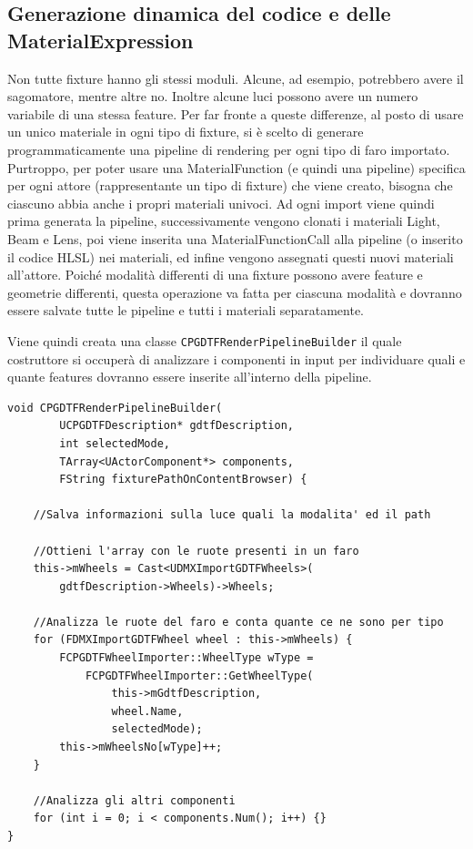 \documentclass[main.tex]{subfiles}
\begin{document}
\clearpage %
\lstset{language=UEcpp}
\subsection{Generazione dinamica del codice e delle MaterialExpression}\label{subsec:2_codeGeneration}
Non tutte fixture hanno gli stessi moduli. Alcune, ad esempio, potrebbero avere il sagomatore, mentre altre no. Inoltre alcune luci possono avere un numero variabile di una stessa feature. Per far fronte a queste differenze, al posto di usare un unico materiale in ogni tipo di fixture, si è scelto di generare programmaticamente una pipeline di rendering per ogni tipo di faro importato. Purtroppo, per poter usare una MaterialFunction (e quindi una pipeline) specifica per ogni attore (rappresentante un tipo di fixture) che viene creato, bisogna che ciascuno abbia anche i propri materiali univoci. Ad ogni import viene quindi prima generata la pipeline, successivamente vengono clonati i materiali Light, Beam e Lens, poi viene inserita una MaterialFunctionCall alla pipeline (o inserito il codice HLSL) nei materiali, ed infine vengono assegnati questi nuovi materiali all'attore. \newline
Poiché modalità differenti di una fixture possono avere feature e geometrie differenti, questa operazione va fatta per ciascuna modalità e dovranno essere salvate tutte le pipeline e tutti i materiali separatamente. \newline

Viene quindi creata una classe \lstinline{CPGDTFRenderPipelineBuilder} il quale costruttore si occuperà di analizzare i componenti in input per individuare quali e quante features dovranno essere inserite all'interno della pipeline.
\begin{lstlisting}
void CPGDTFRenderPipelineBuilder(
        UCPGDTFDescription* gdtfDescription,
        int selectedMode,
        TArray<UActorComponent*> components,
        FString fixturePathOnContentBrowser) {

    //Salva informazioni sulla luce quali la modalita' ed il path

	//Ottieni l'array con le ruote presenti in un faro
    this->mWheels = Cast<UDMXImportGDTFWheels>(
        gdtfDescription->Wheels)->Wheels;

    //Analizza le ruote del faro e conta quante ce ne sono per tipo
	for (FDMXImportGDTFWheel wheel : this->mWheels) {
		FCPGDTFWheelImporter::WheelType wType =
            FCPGDTFWheelImporter::GetWheelType(
                this->mGdtfDescription,
                wheel.Name,
                selectedMode);
		this->mWheelsNo[wType]++;
	}

    //Analizza gli altri componenti
	for (int i = 0; i < components.Num(); i++) {}
}
\end{lstlisting}
\end{document}
